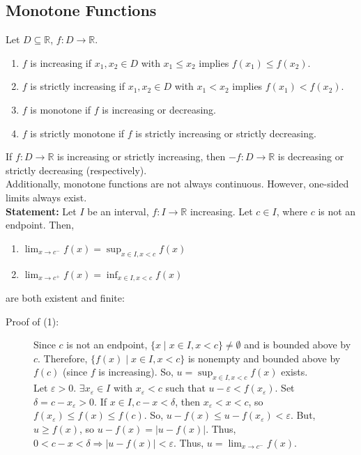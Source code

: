 \documentclass[10pt]{extarticle}
\newcommand{\R}{\mathbb{R}}
\begin{document}
  \subsection{Monotone Functions}%
    Let $D\subseteq \R$, $f: D\rightarrow \R$. 
    \begin{enumerate}[(1)]
      \item $f$ is increasing if $x_1,x_2\in D$ with $x_1\leq x_2$ implies $f(x_1)\leq f(x_2)$.
      \item $f$ is strictly increasing if $x_1,x_2\in D$ with $x_1 < x_2$ implies $f(x_1) < f(x_2)$.
      \item $f$ is monotone if $f$ is increasing or decreasing.
      \item $f$ is strictly monotone if $f$ is strictly increasing or strictly decreasing.
    \end{enumerate}
    If $f: D\rightarrow \R$ is increasing or strictly increasing, then $-f: D\rightarrow \R$ is decreasing or strictly decreasing (respectively).\\

    Additionally, monotone functions are not always continuous. However, one-sided limits always exist.\\

    \textbf{Statement:} Let $I$ be an interval, $f: I\rightarrow \R$ increasing. Let $c\in I$, where $c$ is not an endpoint. Then,
    \begin{enumerate}[(1)]
      \item $\lim_{x\rightarrow c^-}f(x) = \sup_{x\in I,x< c}f(x)$
      \item $\lim_{x\rightarrow c^+}f(x) = \inf_{x\in I,x < c}f(x)$
    \end{enumerate}
    are both existent and finite:
    \begin{description}
      \item[Proof of (1):] Since $c$ is not an endpoint, $\{x\mid x\in I,x< c\}\neq \emptyset$ and is bounded above by $c$. Therefore, $\{f(x)\mid x\in I, x < c\}$ is nonempty and bounded above by $f(c)$ (since $f$ is increasing). So, $u = \sup_{x\in I,x < c}f(x)$ exists.\\

        Let $\varepsilon > 0$. $\exists x_{\varepsilon}\in I$ with $x_{\varepsilon} < c$ such that $ u - \varepsilon < f(x_{\varepsilon}) $. Set $\delta = c-x_{\varepsilon} > 0$. If $x\in I,c-x < \delta$, then $x_{\varepsilon} < x < c$, so $f(x_{\varepsilon}) \leq f(x) \leq f(c)$. So, $u - f(x) \leq u-f(x_{\varepsilon}) < \varepsilon$. But, $u \geq f(x)$, so $u-f(x) = |u-f(x)|$. Thus, $0 < c-x < \delta \Rightarrow |u-f(x)| < \varepsilon$. Thus, $u = \lim_{x\rightarrow c^-}f(x)$.
    \end{description}
\end{document}
